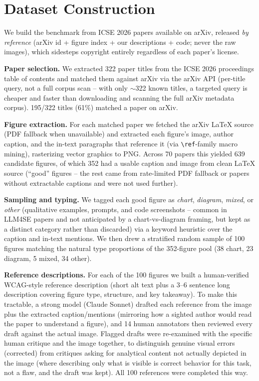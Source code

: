 \documentclass[10pt,conference]{IEEEtran}
\begin{document}
\section{Dataset Construction}

We build the benchmark from ICSE 2026 papers available on arXiv, released \emph{by reference} (arXiv id + figure index + our descriptions + code; never the raw images), which sidesteps copyright entirely regardless of each paper's license.

\textbf{Paper selection.} We extracted 322 paper titles from the ICSE 2026 proceedings table of contents and matched them against arXiv via the arXiv API (per-title query, not a full corpus scan -- with only $\sim$322 known titles, a targeted query is cheaper and faster than downloading and scanning the full arXiv metadata corpus). 195/322 titles (61\%) matched a paper on arXiv.

\textbf{Figure extraction.} For each matched paper we fetched the arXiv LaTeX source (PDF fallback when unavailable) and extracted each figure's image, author caption, and the in-text paragraphs that reference it (via \texttt{\textbackslash ref}-family macro mining), rasterizing vector graphics to PNG. Across 70 papers this yielded 639 candidate figures, of which 352 had a usable caption and image from clean LaTeX source (``good'' figures -- the rest came from rate-limited PDF fallback or papers without extractable captions and were not used further).

\textbf{Sampling and typing.} We tagged each good figure as \emph{chart}, \emph{diagram}, \emph{mixed}, or \emph{other} (qualitative examples, prompts, and code screenshots -- common in LLM4SE papers and not anticipated by a chart-vs-diagram framing, but kept as a distinct category rather than discarded) via a keyword heuristic over the caption and in-text mentions. We then drew a stratified random sample of 100 figures matching the natural type proportions of the 352-figure pool (38 chart, 23 diagram, 5 mixed, 34 other).

\textbf{Reference descriptions.} For each of the 100 figures we built a human-verified WCAG-style reference description (short alt text plus a 3--6 sentence long description covering figure type, structure, and key takeaway). To make this tractable, a strong model (Claude Sonnet) drafted each reference from the image plus the extracted caption/mentions (mirroring how a sighted author would read the paper to understand a figure), and 14 human annotators then reviewed every draft against the actual image. Flagged drafts were re-examined with the specific human critique and the image together, to distinguish genuine visual errors (corrected) from critiques asking for analytical content not actually depicted in the image (where describing only what is visible is correct behavior for this task, not a flaw, and the draft was kept). All 100 references were completed this way.
\end{document}
